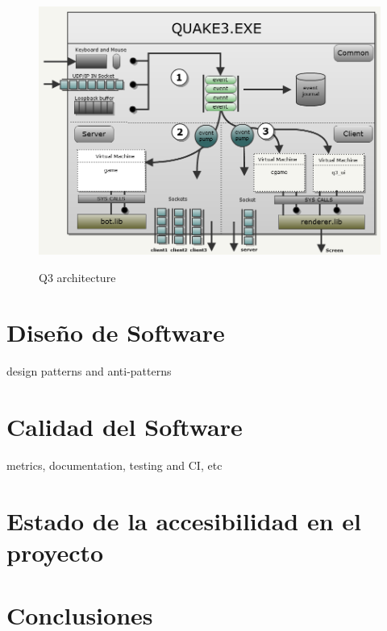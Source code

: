 \documentclass[a4paper,12pt]{report}
\begin{document}
		\begin{center}
			\begin{figure}[h]
				\includegraphics[width=1\textwidth]{images/q3_architecture}
				\label{fig:architecture}
				\caption{Q3 architecture}
			\end{figure}
		\end{center}
	
	
	
	\newpage
	\section{Diseño de Software}
	design patterns and anti-patterns\\
	
	\section{Calidad del Software}
	metrics, documentation, testing and CI, etc\\
	
	\section{Estado de la accesibilidad en el proyecto}
	
	\section{Conclusiones}
			
	
	
	
	
\end{document}

